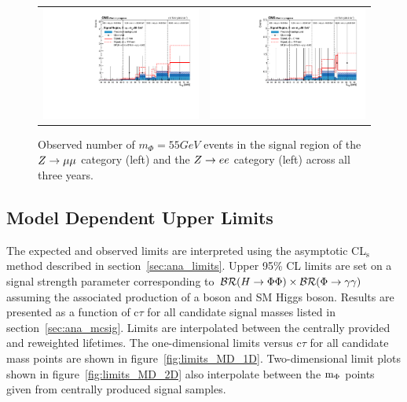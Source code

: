 \begin{figure}[htb!]
\begin{tabular}{c c}
		\includegraphics[width=0.45\linewidth]{figs/05_analysis/closure_ZH_MU_m55_data_2016.pdf} &
		\includegraphics[width=0.45\linewidth]{figs/05_analysis/closure_ZH_ELE_m55_data_2016.pdf} \\
	\end{tabular}
	\caption[Observed number of $m_\Phi=55\unit{GeV}$ events in the signal region of the $\VZ\to\mu\mu$ category (left) and the $\VZ\to ee$ category (left) across all three years.]{Observed number of $m_\Phi=55\unit{GeV}$ events in the signal region of the $\VZ\to\mu\mu$ category (left) and the $\VZ\to ee$ category (left) across all three years.}
	\label{fig:results_m55}
\end{figure}

\subsection{Model Dependent Upper Limits} \label{sec:ana_moddepUL}
The expected and observed limits are interpreted using the asymptotic CL$_\mathrm{s}$ method described in section~\ref{sec:ana_limits}. Upper 95\% CL limits are set on a signal strength parameter corresponding to $\mathcal{BR}(H\to\Phi\Phi)\times\mathcal{BR}(\Phi\to\gamma\gamma)$ assuming the associated production of a \VZ boson and SM Higgs boson. Results are presented as a function of $\mathrm{c}\tau$ for all candidate signal masses listed in section~\ref{sec:ana_mcsig}. Limits are interpolated between the centrally provided and reweighted lifetimes. The one-dimensional limits versus c$\tau$ for all candidate mass points are shown in figure~\ref{fig:limits_MD_1D}. Two-dimensional limit plots shown in figure~\ref{fig:limits_MD_2D} also interpolate between the $\text{m}_\Phi$ points given from centrally produced signal samples.

